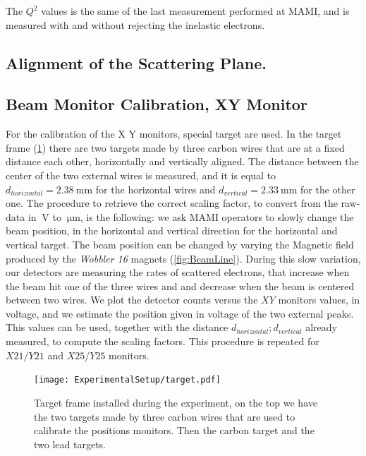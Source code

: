 The $Q^{2}$ values is the same of the last measurement performed at MAMI, and is measured with and without rejecting the inelastic electrons. 

\subsection{Alignment of the Scattering Plane.}

\subsection{Beam Monitor Calibration, XY Monitor}

For the calibration of the X Y monitors, special target are used. In the target frame (\ref{fig:targetFrame}) there are two targets made by three carbon wires that are at a fixed distance each other, horizontally and vertically aligned. The distance between the center of the two external wires is measured, and it is equal to $ d_{horizontal} = \SI{2.38}{\milli \meter}$ for the horizontal wires and $d_{vertical} = \SI{2.33}{\milli \meter}$ for the other one.
The procedure to retrieve the correct scaling factor, to convert from the raw-data in $\SI{}{\volt}$ to $\SI{}{\micro \meter}$, is the following: we ask MAMI operators to slowly change the beam position, in the horizontal and vertical direction for the horizontal and vertical target. The beam position can be changed by varying the Magnetic field produced by the \textit{Wobbler 16} magnets (\ref{fig:BeamLine}). 
During this slow variation, our detectors are measuring the rates of scattered electrons, that increase when the beam hit one of the three wires and and decrease when the beam is centered between two wires. We plot the detector counts versus the $XY$ monitors values, in voltage, and we estimate the position given in voltage of the two external peaks. This values can be used, together with the distance $d_{horizontal};d_{vertical}$ already measured, to compute the scaling factors. This procedure is repeated for $X21/Y21$ and $X25/Y25$ monitors.


\begin{figure}[htb]
\centering
\texttt{[image: ExperimentalSetup/target.pdf]}
\caption{Target frame installed during the experiment, on the top we have the two targets made by three carbon wires that are used to calibrate the positions monitors. Then the carbon target and the two lead targets.}
\label{fig:targetFrame}
\end{figure}

